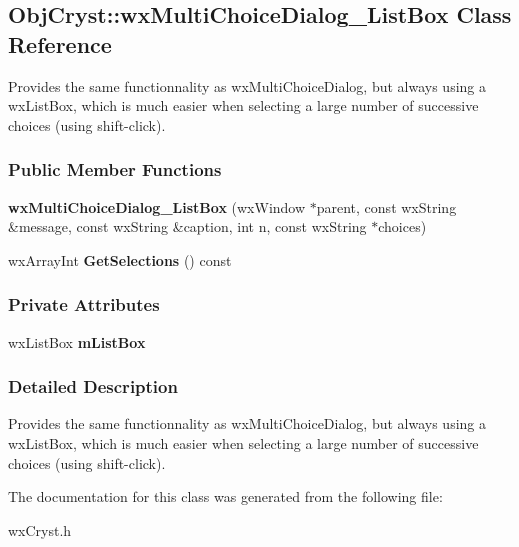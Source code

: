 \subsection{ObjCryst::wxMultiChoiceDialog\_\-ListBox Class Reference}
\label{a00133}


Provides the same functionnality as wxMultiChoiceDialog, but always using a wxListBox, which is much easier when selecting a large number of successive choices (using shift-\/click).  
\subsubsection*{Public Member Functions}
\begin{DoxyCompactItemize}
\item 
{\bfseries wxMultiChoiceDialog\_\-ListBox} (wxWindow $\ast$parent, const wxString \&message, const wxString \&caption, int n, const wxString $\ast$choices)\label{a00133_a3048c7db35d3c35a993ca818f8ec3087}

\item 
wxArrayInt {\bfseries GetSelections} () const \label{a00133_a128fb92ed6304bca6df23e9839b0d44d}

\end{DoxyCompactItemize}
\subsubsection*{Private Attributes}
\begin{DoxyCompactItemize}
\item 
wxListBox {\bfseries mListBox}\label{a00133_a145d64abc35498abb940f28ab81aebda}

\end{DoxyCompactItemize}


\subsubsection{Detailed Description}
Provides the same functionnality as wxMultiChoiceDialog, but always using a wxListBox, which is much easier when selecting a large number of successive choices (using shift-\/click). 

The documentation for this class was generated from the following file:\begin{DoxyCompactItemize}
\item 
wxCryst.h\end{DoxyCompactItemize}
